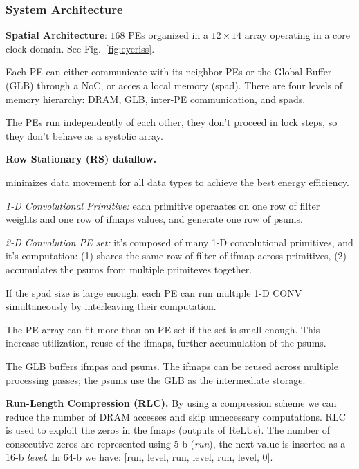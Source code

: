 \subsubsection{System Architecture}
\begin{dashlist}
    \item \textbf{Spatial Architecture}: $168$ PEs organized in a $12 \times 14$ array operating in a core clock domain. See Fig.~\ref{fig:eyeriss}.
    \item Each PE can either communicate with its neighbor PEs or the Global Buffer (GLB) through a NoC, or acces a local memory (spad). There are four levels of memory hierarchy: DRAM, GLB, inter-PE communication, and spads.
    \item The PEs run independently of each other, they don't proceed in lock steps, so they don't behave as a systolic array.
    \item \textbf{Row Stationary (RS) dataflow.}
    \begin{dashlist}
        \item minimizes data movement for all data types to achieve the best energy efficiency.
        \item \textit{1-D Convolutional Primitive:} each primitive operaates on one row of filter weights and one row of ifmaps values, and generate one row of psums.
        \item \textit{2-D Convolution PE set:} it's composed of many 1-D convolutional primitives, and it's computation: (1) shares the same row of filter of ifmap across primitives, (2) accumulates the psums from multiple primiteves together.
        \item If the spad size is large enough, each PE can run multiple 1-D CONV simultaneously by interleaving their computation.
        \item The PE array can fit more than on PE set if the set is small enough. This increase utilization, reuse of the ifmaps, further accumulation of the psums.
        \item The GLB buffers ifmpas and psums. The ifmaps can be reused across multiple processing passes; the psums use the GLB as the intermediate storage.
    \end{dashlist}
    \item \textbf{Run-Length Compression (RLC).} By using a compression scheme we can reduce the number of DRAM accesses and skip unnecessary computations. RLC is used to exploit the zeros in the fmaps (outputs of ReLUs). The number of consecutive zeros are represented using 5-b (\textit{run}), the next value is inserted as a 16-b \textit{level}. In 64-b we have: [run, level, run, level, run, level, 0].
\end{dashlist}

